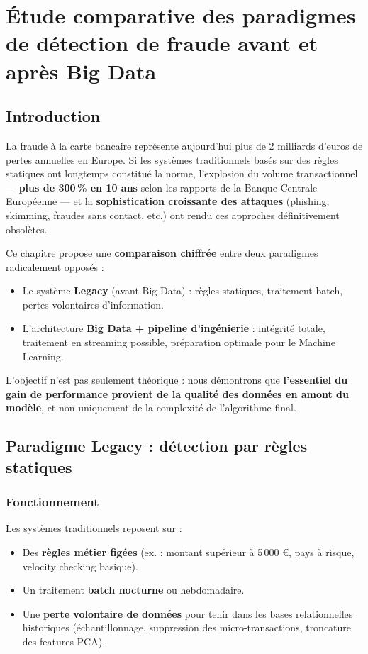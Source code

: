 \chapter{Étude comparative des paradigmes de détection de fraude avant et après Big Data}
\label{chap:comparaison}

\section{Introduction}
La fraude à la carte bancaire représente aujourd’hui plus de 2 milliards d’euros de pertes annuelles en Europe. Si les systèmes traditionnels basés sur des règles statiques ont longtemps constitué la norme, l’explosion du volume transactionnel — \textbf{plus de 300\,\% en 10 ans} selon les rapports de la Banque Centrale Européenne — et la \textbf{sophistication croissante des attaques} (phishing, skimming, fraudes sans contact, etc.) 
ont rendu ces approches définitivement obsolètes.

Ce chapitre propose une \textbf{comparaison chiffrée} entre deux paradigmes radicalement opposés :
\begin{itemize}
    \item Le système \textbf{Legacy} (avant Big Data) : règles statiques, traitement batch, pertes volontaires d’information.
    \item L’architecture \textbf{Big Data + pipeline d’ingénierie} : intégrité totale, traitement en streaming possible, préparation optimale pour le Machine Learning.
\end{itemize}

L’objectif n’est pas seulement théorique : nous démontrons que \textbf{l’essentiel du gain de performance provient de la qualité des données en amont du modèle}, et non uniquement de la complexité de l’algorithme final.

\section{Paradigme Legacy : détection par règles statiques}

\subsection{Fonctionnement}
Les systèmes traditionnels reposent sur :
\begin{itemize}
    \item Des \textbf{règles métier figées} (ex. : montant supérieur à 5\,000 €, pays à risque, velocity checking basique).
    \item Un traitement \textbf{batch nocturne} ou hebdomadaire.
    \item Une \textbf{perte volontaire de données} pour tenir dans les bases relationnelles historiques (échantillonnage, suppression des micro-transactions, troncature des features PCA).
\end{itemize}

